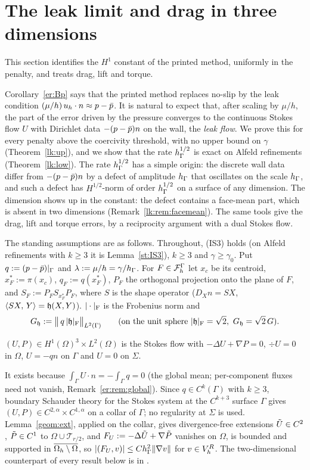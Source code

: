 \section{The leak limit and drag in three dimensions}\label{sec:leak}

This section identifies the $H^1$ constant of the printed method, uniformly in the penalty, and treats drag, lift and torque.

Corollary~\ref{er:Bp} says that the printed method replaces no-slip by the leak condition $(\mu/h)\,u_h\cdot n\approx p-\bar p$. It is natural to expect that, after scaling by $\mu/h$, the part of the error driven by the pressure converges to the continuous Stokes flow $U$ with Dirichlet data $-(p-\bar p)n$ on the wall, the \emph{leak flow}. We prove this for every penalty above the coercivity threshold, with no upper bound on $\gamma$ (Theorem~\ref{lk:up}), and we show that the rate $h_\Gamma^{1/2}$ is exact on Alfeld refinements (Theorem~\ref{lk:low}). The rate $h_\Gamma^{1/2}$ has a simple origin: the discrete wall data differ from $-(p-\bar p)n$ by a defect of amplitude $h_\Gamma$ that oscillates on the scale $h_\Gamma$, and such a defect has $H^{1/2}$-norm of order $h_\Gamma^{1/2}$ on a surface of any dimension. The dimension shows up in the constant: the defect contains a face-mean part, which is absent in two dimensions (Remark~\ref{lk:rem:facemean}). The same tools give the drag, lift and torque errors, by a reciprocity argument with a dual Stokes flow.

The standing assumptions are as follows. Throughout, (IS3) holds (on Alfeld refinements with $k\ge3$ it is Lemma~\ref{st:IS3}), $k\ge3$ and $\gamma\ge\gamma_0$. Put $q:=(p-\bar p)|_\Gamma$ and $\lambda:=\mu/h=\gamma/h_\Gamma$. For $F\in\mathcal F_h^\Gamma$ let $x_c$ be its centroid, $x_F^\ast:=\pi(x_c)$, $q_F:=q(x_F^\ast)$, $P_F$ the orthogonal projection onto the plane of $F$, and $S_F:=P_FS_{x_F^\ast}P_F$, where $S$ is the shape operator ($D_Xn=SX$, $\langle SX,\, Y\rangle=\mathfrak h(X,Y)$). $|\cdot|_{\rm F}$ is the Frobenius norm and
\[
G_\mathfrak h:=\bigl\|\,q\,|\mathfrak h|_{\rm F}\bigr\|_{L^2(\Gamma)}\qquad(\text{on the unit sphere }|\mathfrak h|_{\rm F}=\sqrt2,\ G_\mathfrak h=\sqrt2\,G).
\]

\begin{definition}\label{lk:U}
$(U,P)\in H^1(\Omega)^3\times L^2(\Omega)$ is the Stokes flow with $-\Delta U+\nabla P=0$, $\div U=0$ in $\Omega$, $U=-qn$ on $\Gamma$ and $U=0$ on $\Sigma$.
\end{definition}
It exists because $\int_\Gamma U\cdot n=-\int_\Gamma q=0$ (the global mean; per-component fluxes need not vanish, Remark~\ref{er:rem:global}). Since $q\in C^k(\Gamma)$ with $k\ge3$, boundary Schauder theory for the Stokes system at the $C^{k+3}$ surface $\Gamma$ gives $(U,P)\in C^{2,\alpha}\times C^{1,\alpha}$ on a collar of $\Gamma$; no regularity at $\Sigma$ is used. Lemma~\ref{geom:ext}, applied on the collar, gives divergence-free extensions $\tilde U\in C^2$, $\tilde P\in C^1$ to $\Omega\cup\mathcal T_{r/2}$, and $F_U:=-\Delta\tilde U+\nabla\tilde P$ vanishes on $\Omega$, is bounded and supported in $\overline{\Omega_h\setminus\Omega}$, so $|(F_U,v)|\le Ch_\Gamma^2\lVert \nabla v\rVert$ for $v\in V_h^R$. The two-dimensional counterpart of every result below is in \cite{PadhiLong2D}.

